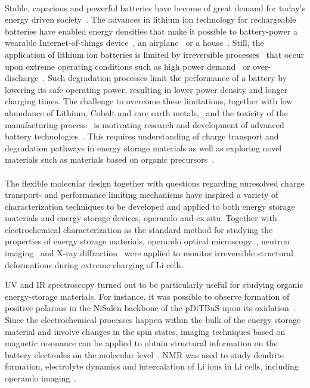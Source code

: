 \paragraph*{}
Stable, capacious and powerful batteries have become of great demand for today's energy driven society~\cite{Yoo2014,Xu2020,Nitta2015}. The advances in lithium ion technology for rechargeable batteries have enabled energy densities that make it possible to battery-power a wearable Internet-of-things device~\cite{Lee2013,Maddikunta2020}, an airplane~\cite{Kadlec2014} or a house~\cite{Diouf2019,Hirasawa2021}. Still, the application of lithium ion batteries is limited by irreversible processes~\cite{Larsson2017,Fu2015,Zhang2021} that occur upon extreme operating conditions such as high power demand~\cite{Zhang2022,Guan2018} or over-discharge~\cite{Ma2020}. Such degradation processes limit the performance of a battery by lowering its safe operating power, resulting in lower power density and longer charging times. The challenge to overcome these limitations, together with low abundance of Lithium, Cobalt and rare earth metals,~\cite{Xu2020,janoschka2012_advmater} and the toxicity of the manufacturing process~\cite{Prazanov2022,Peters2017} is motivating research and development of advanced battery technologies~\cite{Degen2022}. This requires understanding of charge transport and degradation pathways in energy storage materials as well as exploring novel materials such as materials based on organic precursors~\cite{Lu2020,Kim2023}.


\paragraph{}
The flexible molecular design together with questions regarding unresolved charge transport- and performance limiting mechanisms have inspired a variety of characterization techniques to be developed and applied to both energy storage materials and energy storage devices, operando and ex-situ. Together with electrochemical characterization as the standard method for studying the properties of energy storage materials\cite{IWASA2007,Zens2022}, operando optical microscopy~\cite{Merryweather2022}, neutron imaging~\cite{Ma2020} and X-ray diffraction~\cite{Rhodes2012} were applied to monitor irreversible structural deformations during extreme charging of Li cells.

UV and IR spectroscopy turned out to be particularly useful for studying organic energy-storage materials. For instance, it was possible to observe formation of positive polarons in the NiSalen backbone of the pDiTBuS upon its oxidation~\cite{Dmitrieva2018}.
Since the electrochemical processes happen within the bulk of the energy storage material and involve changes in the spin states, imaging techniques based on magnetic resonance can be applied to obtain structural information on the battery electrodes on the molecular level~\cite{Niemoller2018,Meier2013,Li2019,Bittl2005}. NMR was used to study dendrite formation, electrolyte dynamics and intercalation of Li ions\cite{Kushida1980,Grosu2023a} in Li cells, including operando imaging~\cite{Shi2019}. 


